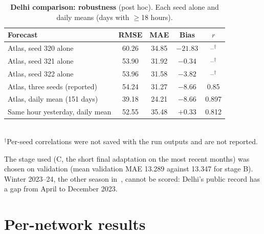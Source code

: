 \documentclass{article}
\begin{document}
\begin{table}[h]
\caption{\textbf{Delhi comparison: robustness} (post hoc). Each seed alone and daily means (days with $\ge$18 hours).}
\label{tab:i1extra}
\centering\small
\begin{tabular}{lcccc}
\toprule
Forecast & RMSE & MAE & Bias & $r$ \\
\midrule
Atlas, seed 320 alone & 60.26 & 34.85 & $-21.83$ & --$^{\dagger}$ \\
Atlas, seed 321 alone & 53.90 & 31.92 & $-0.34$ & --$^{\dagger}$ \\
Atlas, seed 322 alone & 53.96 & 31.58 & $-3.82$ & --$^{\dagger}$ \\
Atlas, three seeds (reported) & 54.24 & 31.27 & $-8.66$ & 0.85 \\
\midrule
Atlas, daily mean (151 days) & 39.18 & 24.21 & $-8.66$ & 0.897 \\
Same hour yesterday, daily mean & 52.55 & 35.48 & $+0.33$ & 0.812 \\
\bottomrule
\end{tabular}
\\[2pt]{\footnotesize $^{\dagger}$Per-seed correlations were not saved with the run outputs and are not reported.}
\end{table}

The stage used (C, the short final adaptation on the most recent months) was chosen on validation (mean validation MAE
13.289 against 13.347 for stage B). Winter 2023--24, the other season in~\citep{ceew2025}, cannot be scored: Delhi's
public record has a gap from April to December 2023.

\section{Per-network results}
\label{app:nets}
\end{document}
